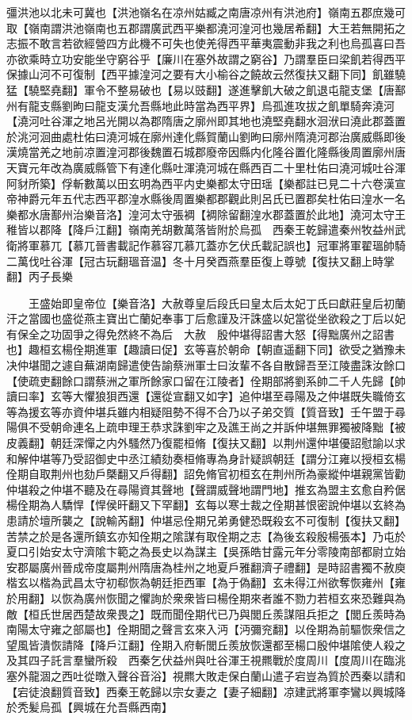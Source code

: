 彊洪池以北未可冀也【洪池嶺名在凉州姑臧之南唐凉州有洪池府】嶺南五郡庶幾可取【嶺南謂洪池嶺南也五郡謂廣武西平樂都澆河湟河也幾居希翻】大王若無開拓之志振不敢言若欲經營四方此機不可失也使羌得西平華夷震動非我之利也烏孤喜曰吾亦欲乘時立功安能坐守窮谷乎【廉川在塞外故謂之窮谷】乃謂羣臣曰梁飢若得西平保據山河不可復制【西平據湟河之要有大小榆谷之饒故云然復扶又翻下同】飢雖驍猛【驍堅堯翻】軍令不整易破也【易以豉翻】遂進擊飢大破之飢退屯龍支堡【唐鄯州有龍支縣劉昫曰龍支漢允吾縣地此時當為西平界】烏孤進攻拔之飢單騎奔澆河【澆河吐谷渾之地呂光開以為郡隋唐之廓州即其地也澆堅堯翻水洄洑曰澆此郡蓋置於洮河洄曲處杜佑曰澆河城在廓州達化縣賀蘭山劉昫曰廓州隋澆河郡治廣威縣即後漢燒當羌之地前凉置湟河郡後魏置石城郡廢帝因縣内化隆谷置化隆縣後周置廓州唐天寶元年改為廣威縣管下有達化縣吐渾澆河城在縣西百二十里杜佑曰澆河城吐谷渾阿豺所築】俘斬數萬以田玄明為西平内史樂都太守田瑶【樂都註已見二十六卷漢宣帝神爵元年五代志西平郡湟水縣後周置樂都郡觀此則呂氏已置郡矣杜佑曰湟水一名樂都水唐鄯州治樂音洛】湟河太守張裯【裯除留翻湟水郡蓋置於此地】澆河太守王稚皆以郡降【降戶江翻】嶺南羌胡數萬落皆附於烏孤　西秦王乾歸遣秦州牧益州武衛將軍慕兀【慕兀晉書載記作慕容兀慕兀蓋亦乞伏氏載記誤也】冠軍將軍翟瑥帥騎二萬伐吐谷渾【冠古玩翻瑥音温】冬十月癸酉燕羣臣復上尊號【復扶又翻上時掌翻】丙子長樂

　　王盛始即皇帝位【樂音洛】大赦尊皇后段氏曰皇太后太妃丁氏曰獻莊皇后初蘭汗之當國也盛從燕主寶出亡蘭妃奉事丁后愈謹及汗誅盛以妃當從坐欲殺之丁后以妃有保全之功固爭之得免然終不為后　大赦　殷仲堪得詔書大怒【得黜廣州之詔書也】趣桓玄楊佺期進軍【趣讀曰促】玄等喜於朝命【朝直遥翻下同】欲受之猶豫未决仲堪聞之遽自蕪湖南歸遣使告諭蔡洲軍士曰汝輩不各自散歸吾至江陵盡誅汝餘口【使疏吏翻餘口謂蔡洲之軍所餘家口留在江陵者】佺期部將劉系帥二千人先歸【帥讀曰率】玄等大懼狼狽西還【還從宣翻又如字】追仲堪至尋陽及之仲堪既失職倚玄等為援玄等亦資仲堪兵雖内相疑阻勢不得不合乃以子弟交質【質音致】壬午盟于尋陽俱不受朝命連名上疏申理王恭求誅劉牢之及譙王尚之并訴仲堪無罪獨被降黜【被皮義翻】朝廷深憚之内外騷然乃復罷桓脩【復扶又翻】以荆州還仲堪優詔慰諭以求和解仲堪等乃受詔御史中丞江績劾奏桓脩專為身計疑誤朝廷【謂分江雍以授桓玄楊佺期自取荆州也劾戶槩翻又戶得翻】詔免脩官初桓玄在荆州所為豪縱仲堪親黨皆勸仲堪殺之仲堪不聽及在尋陽資其聲地【聲謂威聲地謂門地】推玄為盟主玄愈自矜倨楊佺期為人驕悍【悍侯旰翻又下罕翻】玄每以寒士裁之佺期甚恨密說仲堪以玄終為患請於壇所襲之【說輸芮翻】仲堪忌佺期兄弟勇健恐既殺玄不可復制【復扶又翻】苦禁之於是各還所鎮玄亦知佺期之隂謀有取佺期之志【為後玄殺殷楊張本】乃屯於夏口引始安太守濟隂卞範之為長史以為謀主【吳孫皓甘露元年分零陵南部都尉立始安郡屬廣州晉成帝度屬荆州隋唐為桂州之地夏戶雅翻濟子禮翻】是時詔書獨不赦庾楷玄以楷為武昌太守初郗恢為朝廷拒西軍【為于偽翻】玄未得江州欲奪恢雍州【雍於用翻】以恢為廣州恢聞之懼詢於衆衆皆曰楊佺期來者誰不勠力若桓玄來恐難與為敵【桓氏世居西楚故衆畏之】既而聞佺期代已乃與閭丘羨謀阻兵拒之【閭丘羨時為南陽太守雍之部屬也】佺期聞之聲言玄來入沔【沔彌兖翻】以佺期為前驅恢衆信之望風皆潰恢請降【降戶江翻】佺期入府斬閭丘羨放恢還都至楊口殷仲堪隂使人殺之及其四子託言羣蠻所殺　西秦乞伏益州與吐谷渾王視羆戰於度周川【度周川在臨洮塞外龍涸之西吐從暾入聲谷音浴】視羆大敗走保白蘭山遣子宕豈為質於西秦以請和【宕徒浪翻質音致】西秦王乾歸以宗女妻之【妻子細翻】凉建武將軍李鸞以興城降於秃髪烏孤【興城在允吾縣西南】

